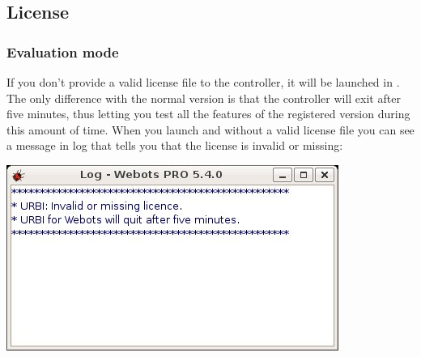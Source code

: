 




\subsection{License}

\subsubsection{Evaluation mode}

If you don't provide a valid license file to the \urbi controller, it
will be launched in . The only difference with
the normal version is that the controller will exit after five
minutes, thus letting you test all the features of the registered
version during this amount of time. When you launch \webots and \urbi
without a valid license file you can see a message in \webots log that
tells you that the license is invalid or missing:

\begin{center}
  \includegraphics{img/webots/no-license-webots-log-msg}
\end{center}

